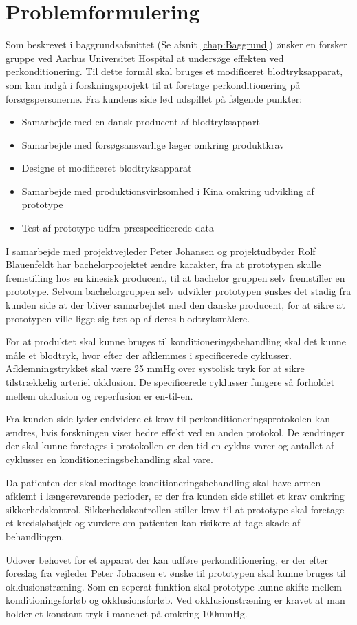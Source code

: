 \chapter{Problemformulering}
Som beskrevet i baggrundsafsnittet (Se afsnit \ref{chap:Baggrund}) ønsker en forsker gruppe ved Aarhus Universitet Hospital at undersøge effekten ved perkonditionering. Til dette formål skal bruges et modificeret blodtryksapparat, som kan indgå i forskningsprojekt til at foretage perkonditionering på forsøgspersonerne. Fra kundens side lød udspillet på følgende punkter:
\begin{itemize}
	\item Samarbejde med en dansk producent af blodtryksappart
	\item Samarbejde med forsøgsansvarlige læger omkring produktkrav
	\item Designe et modificeret blodtryksapparat
	\item Samarbejde med produktionsvirksomhed i Kina omkring udvikling af prototype 
	\item Test af prototype udfra præspecificerede data
\end{itemize}

I samarbejde med projektvejleder Peter Johansen og projektudbyder Rolf Blauenfeldt har bachelorprojektet ændre karakter, fra at prototypen skulle fremstilling hos en kinesisk producent, til at bachelor gruppen selv fremstiller en prototype. Selvom bachelorgruppen selv udvikler prototypen ønskes det stadig fra kunden side at der bliver samarbejdet med den danske producent, for at sikre at prototypen ville ligge sig tæt op af deres blodtryksmålere.

For at produktet skal kunne bruges til konditioneringsbehandling skal det kunne måle et blodtryk, hvor efter der afklemmes i specificerede cyklusser. Afklemningstrykket skal være 25 mmHg over systolisk tryk for at sikre tilstrækkelig arteriel okklusion. De specificerede cyklusser fungere så forholdet mellem okklusion og reperfusion er en-til-en. 

Fra kunden side lyder endvidere et krav til perkonditioneringsprotokolen kan ændres, hvis forskningen viser bedre effekt ved en anden protokol. De ændringer der skal kunne foretages i protokollen er den tid en cyklus varer og antallet af cyklusser en konditioneringsbehandling skal vare. 

Da patienten der skal modtage konditioneringsbehandling skal have armen afklemt i længerevarende perioder, er der fra kunden side stillet et krav omkring sikkerhedskontrol. Sikkerhedskontrollen stiller krav til at prototype skal foretage et kredsløbstjek og vurdere om patienten kan risikere at tage skade af behandlingen.

Udover behovet for et apparat der kan udføre perkonditionering, er der efter foreslag fra vejleder Peter Johansen et ønske til prototypen skal kunne bruges til okklusionstræning. Som en seperat funktion skal prototype kunne skifte mellem konditioningsforløb og okklusionsforløb. Ved okklusionstræning er kravet at man holder et konstant tryk i manchet på omkring 100mmHg. 


